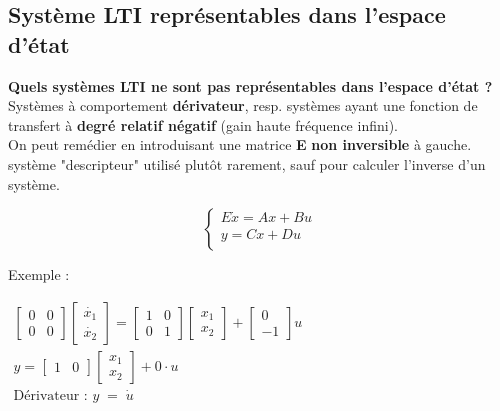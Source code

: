 \documentclass[document.tex]{subfiles}
\begin{document}
\subsection{Système LTI représentables dans l'espace d'état}
\textbf{Quels systèmes LTI ne sont pas représentables dans l'espace d'état ?} \\
Systèmes à comportement \textbf{dérivateur}, resp. systèmes ayant une fonction de transfert à \textbf{degré relatif négatif} (gain haute fréquence infini).\\
On peut remédier en introduisant une matrice \textbf{E} \textbf{non inversible} à gauche.\\

système "descripteur" utilisé plutôt rarement, sauf pour calculer l'inverse d'un système.

\begin{equation}
\begin{cases}
	E \dot{x} = Ax + Bu \\
	y = Cx + Du \\
\end{cases}
\end{equation}

Exemple : \\
\begin{center}
$
\begin{array}{l}
	\begin{bmatrix}
		0 & 0 \\ 0 & 0 \end{bmatrix} \begin{bmatrix}
		\dot{x_1} \\ \dot{x_2}
		\end{bmatrix} = \begin{bmatrix}
		1 & 0 \\ 0 & 1
		\end{bmatrix} \begin{bmatrix}
		x_1 \\ x_2
		\end{bmatrix} + \begin{bmatrix}
			0 \\ -1
		\end{bmatrix} u \\[24pt]
		y = \begin{bmatrix}
		1 & 0 \end{bmatrix} \begin{bmatrix}
		x_1 \\ x_2 \end{bmatrix} + 0 \cdot u \\[24pt]
		\text{Dérivateur : } y \; = \; \dot{u}
\end{array}
$
\end{center}
\end{document}
